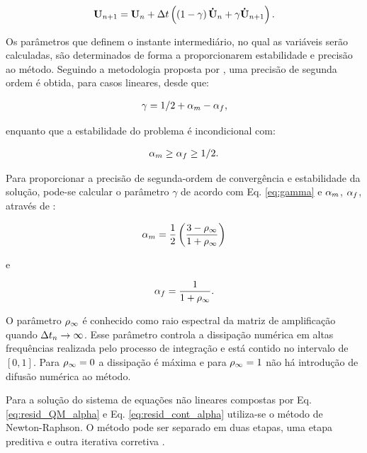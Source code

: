 \documentclass[tese_patricia]{subfiles}%
\begin{document}
\begin{gather}
\mathbf{U}_{n+1} = \mathbf{U}_n + \Delta t\left(\left(1-\gamma\right)\mathbf{\dot{U}}_n + \gamma\mathbf{\dot{U}}_{n+1} \right). \label{eq:Newmark}
\end{gather}

Os parâmetros que definem o instante intermediário, no qual as variáveis serão calculadas, são determinados de forma a proporcionarem estabilidade e precisão ao método. Seguindo a metodologia proposta por , uma precisão de segunda ordem é obtida, para casos lineares, desde que: 

\begin{gather}
\gamma = 1/2 + \alpha_m - \alpha_f,\label{eq:gamma}
\end{gather}

\noindent enquanto que a estabilidade do problema é incondicional com:

\begin{gather}
\alpha_m \ge \alpha_f \ge 1/2.
\end{gather}

Para proporcionar a precisão de segunda-ordem de convergência e estabilidade da solução, pode-se calcular o parâmetro $\gamma$ de acordo com Eq. \ref {eq:gamma} e $\alpha_m$, $\alpha_f$, através de \cite{Hughes:2000}:


\begin{gather}
\alpha_m = \frac{1}{2}\left(\frac{3 - \rho_\infty}{1+\rho_\infty}\right)\label{eq:alpha_m}\\
\end{gather}

\noindent e

\begin{gather}
\alpha_f = \frac{1}{1+\rho_\infty}\label{eq:alpha_f}.
\end{gather}

O parâmetro $\rho_\infty$ é conhecido como raio espectral da matriz de amplificação quando $\Delta t_{n} \rightarrow \infty$. Esse parâmetro controla a dissipação numérica em altas frequências realizada pelo processo de integração e está contido no intervalo de $[0,1]$. Para $\rho_\infty = 0$ a dissipação é máxima e para $\rho_\infty = 1$ não há introdução de difusão numérica ao método.

Para a solução do sistema de equações não lineares compostas por Eq. \eqref{eq:resid_QM_alpha} e Eq. \eqref{eq:resid_cont_alpha} utiliza-se o método de Newton-Raphson. O método pode ser separado em duas etapas, uma etapa preditiva e outra iterativa corretiva \cite{BazilevsTT:2013}.
\end{document}
